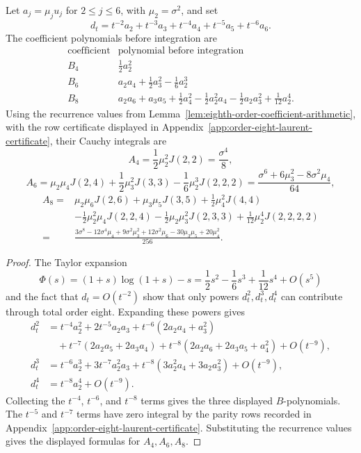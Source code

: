 \begin{lemma}%
\label{lem:n4-entropy-coefficient-substitution}
Let \(a_j=\mu_j u_j\) for \(2\le j\le6\), with \(\mu_2=\sigma^2\), and set
\[
d_t=t^{-2}a_2+t^{-3}a_3+t^{-4}a_4+t^{-5}a_5+t^{-6}a_6 .
\]
The coefficient polynomials before integration are
\[
\begin{array}{c|c}
\text{coefficient} & \text{polynomial before integration}\\
\hline
B_4 & \frac12a_2^2\\[0.25em]
B_6 & a_2a_4+\frac12a_3^2-\frac16a_2^3\\[0.25em]
B_8 &
a_2a_6+a_3a_5+\frac12a_4^2
-\frac12a_2^2a_4-\frac12a_2a_3^2+\frac1{12}a_2^4 .
\end{array}
\]
Using the recurrence values from
Lemma~\ref{lem:eighth-order-coefficient-arithmetic}, with the row certificate
displayed in Appendix~\ref{app:order-eight-laurent-certificate}, their
Cauchy integrals are
\[
A_4=\frac12\mu_2^2J(2,2)=\frac{\sigma^4}{8},
\]
\[
A_6=\mu_2\mu_4J(2,4)+\frac12\mu_3^2J(3,3)
-\frac16\mu_2^3J(2,2,2)
=\frac{\sigma^6+6\mu_3^2-8\sigma^2\mu_4}{64},
\]
\[
\begin{aligned}
A_8={}&\mu_2\mu_6J(2,6)+\mu_3\mu_5J(3,5)
+\frac12\mu_4^2J(4,4)\\
&-\frac12\mu_2^2\mu_4J(2,2,4)
-\frac12\mu_2\mu_3^2J(2,3,3)
+\frac1{12}\mu_2^4J(2,2,2,2)\\
={}&\frac{3\sigma^8-12\sigma^4\mu_4+9\sigma^2\mu_3^2
+12\sigma^2\mu_6-30\mu_3\mu_5+20\mu_4^2}{256}.
\end{aligned}
\]
\end{lemma}

\begin{proof}
The Taylor expansion
\[
\Phi(s)=(1+s)\log(1+s)-s
=\frac12s^2-\frac16s^3+\frac1{12}s^4+O(s^5)
\]
and the fact that \(d_t=O(t^{-2})\) show that only powers \(d_t^2,d_t^3,d_t^4\)
can contribute through total order eight.  Expanding these powers gives
\begin{align*}
d_t^2
&=t^{-4}a_2^2+2t^{-5}a_2a_3
+t^{-6}(2a_2a_4+a_3^2) \\
&\quad
+t^{-7}(2a_2a_5+2a_3a_4)
+t^{-8}(2a_2a_6+2a_3a_5+a_4^2)+O(t^{-9}),\\
d_t^3
&=t^{-6}a_2^3+3t^{-7}a_2^2a_3
+t^{-8}(3a_2^2a_4+3a_2a_3^2)+O(t^{-9}),\\
d_t^4
&=t^{-8}a_2^4+O(t^{-9}).
\end{align*}
Collecting the \(t^{-4}\), \(t^{-6}\), and \(t^{-8}\) terms gives the three
displayed \(B\)-polynomials.  The \(t^{-5}\) and \(t^{-7}\) terms have zero
integral by the parity rows recorded in
Appendix~\ref{app:order-eight-laurent-certificate}.  Substituting the
recurrence values gives the displayed formulas for \(A_4,A_6,A_8\).
\end{proof}

